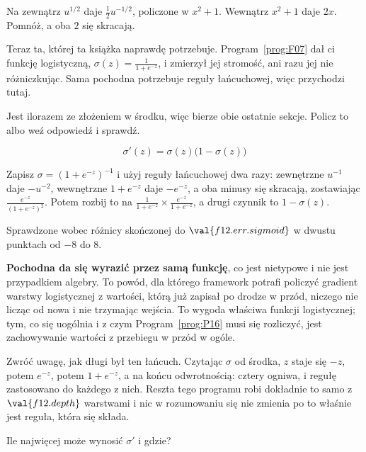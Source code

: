 \begin{fr}
Na zewnątrz $u^{1/2}$ daje $\frac{1}{2}u^{-1/2}$, policzone w $x^{2}+1$.
Wewnątrz $x^{2}+1$ daje $2x$. Pomnóż, a oba $2$ się skracają.

Teraz ta, której ta książka naprawdę potrzebuje. Program~\ref{prog:F07} dał ci
funkcję logistyczną, $\sigma(z) = \frac{1}{1 + e^{-z}}$, i zmierzył jej
stromość, ani razu jej nie różniczkując. Sama pochodna potrzebuje reguły
łańcuchowej, więc przychodzi tutaj.

Jest ilorazem ze złożeniem w środku, więc bierze obie ostatnie sekcje. Policz
to albo weź odpowiedź i sprawdź.
\dotline
\nextframe
\end{fr}

\begin{fr}
\begin{ansblock}
\[ \sigma'(z) = \sigma(z)\bigl(1 - \sigma(z)\bigr) \]
\end{ansblock}

Zapisz $\sigma = (1 + e^{-z})^{-1}$ i użyj reguły łańcuchowej dwa razy:
zewnętrzne $u^{-1}$ daje $-u^{-2}$, wewnętrzne $1 + e^{-z}$ daje $-e^{-z}$, a
oba minusy się skracają, zostawiając $\frac{e^{-z}}{(1+e^{-z})^{2}}$. Potem
rozbij to na $\frac{1}{1+e^{-z}} \times \frac{e^{-z}}{1+e^{-z}}$, a drugi
czynnik to $1 - \sigma(z)$.

Sprawdzone wobec różnicy skończonej do $\val{f12.err.sigmoid}$ w dwustu
punktach od $-8$ do $8$.

\begin{note}
\textbf{Pochodna da się wyrazić przez samą funkcję}, co jest nietypowe i nie
jest przypadkiem algebry. To powód, dla którego framework potrafi policzyć
gradient warstwy logistycznej z wartości, którą już zapisał po drodze w przód,
niczego nie licząc od nowa i nie trzymając wejścia. To wygoda właściwa
funkcji logistycznej; tym, co się uogólnia i z czym Program~\ref{prog:P16}
musi się rozliczyć, jest zachowywanie wartości z przebiegu w przód w ogóle.
\end{note}

Zwróć uwagę, jak długi był ten łańcuch. Czytając $\sigma$ od środka, $z$
staje się $-z$, potem $e^{-z}$, potem $1 + e^{-z}$, a na końcu odwrotnością:
cztery ogniwa, i regułę zastosowano do każdego z nich. Reszta tego programu
robi dokładnie to samo z $\val{f12.depth}$ warstwami i nic w rozumowaniu się
nie zmienia \dash{} po to właśnie jest reguła, która się składa.

Ile najwięcej może wynosić $\sigma'$ i gdzie?
\nextframe
\end{fr}

